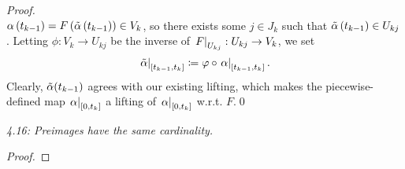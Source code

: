 \documentclass[../Moduli_Spaces_of_Riemann_Surfaces.tex]{subfiles}
\begin{document}
\begin{proof}
{\begin{equation*}
            \end{equation*}
        } $\alpha\left(t_{k-1}\right)=F\left(\tilde{\alpha}\left(t_{k-1}\right)\right)\in V_k$, so there exists some $j\in J_k$ such that $\tilde{\alpha}\left(t_{k-1}\right)\in U_{kj}$. Letting $\phi:V_k\to U_{kj}$ be the inverse of $\left.F\right|_{U_{kj}}:U_{kj}\to V_k$, we set
        \begin{equation*}
            \left.\tilde{\alpha}\right|_{\left[t_{k-1},t_k\right]}\coloneqq\varphi\circ\left.\alpha\right|_{\left[t_{k-1},t_k\right]}.
        \end{equation*}
        Clearly, $\tilde{\alpha}\!\left(t_{k-1}\right)$ agrees with our existing lifting, which makes the piecewise-defined map $\left.\alpha\right|_{\left[0,t_k\right]}$ a lifting of $\left.\alpha\right|_{\left[0,t_k\right]}$ w.r.t. $F$.\qed
    \end{proof}
    \begin{theorem}\label{2.2:thm:preimage_cardinality}
        \textit{4.16: Preimages have the same cardinality.}
    \end{theorem}
    \begin{proof}

    \end{proof}
\end{document}
